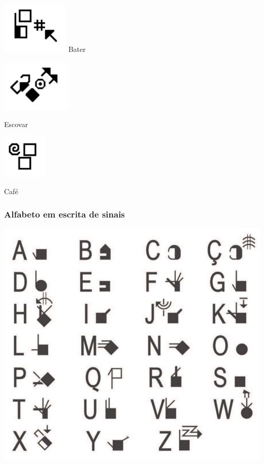 \documentclass[10pt]{beamer}
\theoremstyle{plain}
\theoremstyle{definition}
\begin{document}
\begin{frame}
\begin{center}
\begin{minipage}{0.3\linewidth}
				\includegraphics[scale=0.4]{figures/basico6-4.png} Bater
			\end{minipage}
			\hspace{0.5cm}
			\begin{minipage}{0.2\linewidth}
				\includegraphics[scale=0.4]{figures/basico6-5.png} 
				
				Escovar
				\vspace{0.5cm}
				
				\includegraphics[scale=0.4]{figures/basico6-6.png} 
				
				Café				
			\end{minipage}
			
		\end{center}
	\end{frame}

		\begin{frame}
			\frametitle{Alfabeto em escrita de sinais}
			\begin{center}
				\includegraphics[scale=0.3]{figures/alfabeto.png}
			\end{center}
		\end{frame}
	
\end{document}
